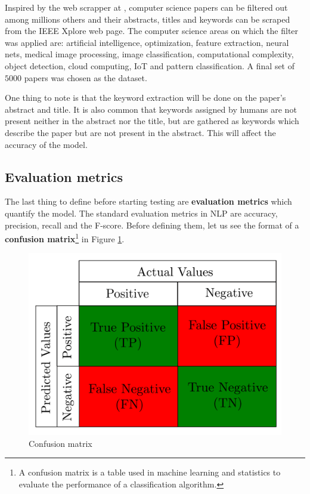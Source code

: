 \documentclass[12pt]{article}
\numberwithin{equation}{section}
\begin{document}
\begin{spacing}{1.5}
	Inspired by the web scrapper at \cite{scrapper}, computer science papers can be filtered out among millions others and their abstracts, titles and keywords can be scraped from the IEEE Xplore web page. The computer science areas on which the filter was applied are: artificial intelligence, optimization, feature extraction, neural nets, medical image processing, image classification, computational complexity, object detection, cloud computing, IoT and pattern classification. A final set of $5000$ papers was chosen as the dataset. 
	
	One thing to note is that the keyword extraction will be done on the paper's abstract and title. It is also common that keywords assigned by humans are not present neither in the abstract nor the title, but are gathered as keywords which describe the paper but are not present in the abstract. This will affect the accuracy of the model. 
	
	\subsection{Evaluation metrics}
	The last thing to define before starting testing are \textbf{evaluation metrics} which quantify the model. The standard evaluation metrics in NLP are accuracy, precision, recall and the F-score. Before defining them, let us see the format of a \textbf{confusion matrix}\footnote{A confusion matrix is a table used in machine learning and statistics to evaluate the performance of a classification algorithm.} in Figure \ref{confusion}.
	
	\begin{figure}[H]
		\centering
		\includegraphics[scale=0.40]{confusion}		
		\caption{Confusion matrix}
		\label{confusion}
	\end{figure}
	

\end{spacing}
\end{document}
